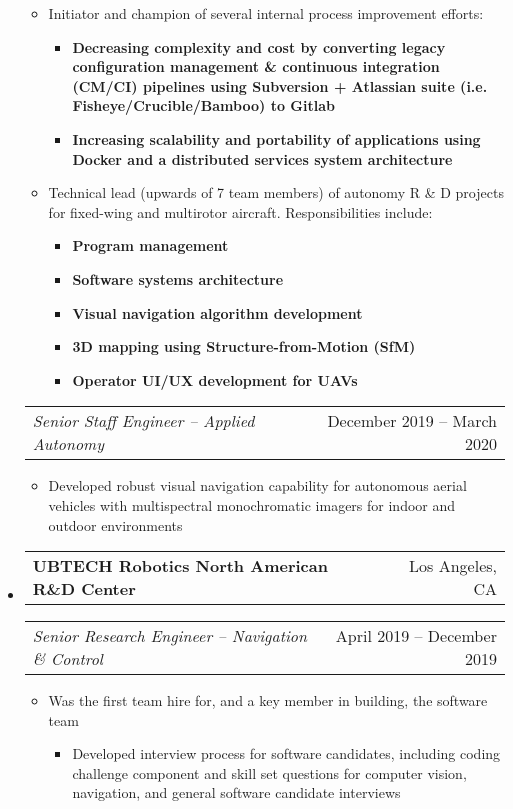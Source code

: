 \documentclass[letterpaper,18pt]{article}
\makeatletter
\newcommand{\resitem}[1]{\item #1 \vspace{-2pt}}
\newcommand{\headerrow}[2]{%
  \hspace*{-\labelsep}%
  \begin{tabular*}{\dimexpr\linewidth+\labelsep}{@{\extracolsep{\fill}}lr@{}}
    #1 &
    #2 \\
  \end{tabular*}%
}
\makeatother
\begin{document}
\begin{itemize}[label={},leftmargin=*,noitemsep]
{\begin{itemize}[noitemsep]
\begin{itemize}[noitemsep]
\begin{itemize}[noitemsep]
                \end{itemize}
                \resitem{Initiator and champion of several internal process improvement efforts:}
                \begin{itemize}[noitemsep]
                    \resitem{\textbf{Decreasing complexity and cost by converting legacy configuration management \& continuous integration (CM/CI) pipelines using Subversion + Atlassian suite (i.e. Fisheye/Crucible/Bamboo) to Gitlab}}
                    \resitem{\textbf{Increasing scalability and portability of applications using Docker and a distributed services system architecture}}
                \end{itemize}
                \resitem{Technical lead (upwards of 7 team members) of autonomy R \& D projects for fixed-wing and multirotor aircraft.  Responsibilities include:}
                \begin{itemize}[noitemsep]
                    \resitem{\textbf{Program management}}
                    \resitem{\textbf{Software systems architecture}}
                    \resitem{\textbf{Visual navigation algorithm development}}
                    \resitem{\textbf{3D mapping using Structure-from-Motion (SfM)}}
                    \resitem{\textbf{Operator UI/UX development for UAVs}}
                \end{itemize}
        \end{itemize}
	\end{itemize}
	}
    \headerrow{\emph{Senior Staff Engineer -- Applied Autonomy}}{December 2019 -- March 2020}
	{\small
	\begin{itemize}[noitemsep]
        \resitem{Developed robust visual navigation capability for autonomous aerial vehicles with multispectral monochromatic imagers for indoor and outdoor environments}
	\end{itemize}
	}
\item
    \headerrow{\textbf{UBTECH Robotics North American R\&D Center}}{Los Angeles, CA}
        \headerrow{\emph{Senior Research Engineer -- Navigation \& Control}}{April 2019 -- December 2019}
	{\small
	\begin{itemize}[noitemsep]
        \resitem{Was the first team hire for, and a key member in building, the software team}
        \begin{itemize}[noitemsep]
                \resitem{Developed interview process for software candidates, including coding challenge component and skill set questions for computer vision, navigation, and general software candidate interviews}

\end{itemize}
\end{itemize}}
\end{itemize}
\end{document}
